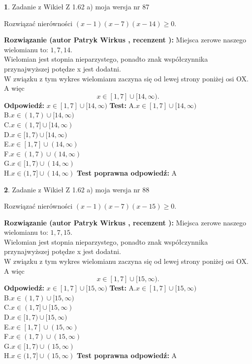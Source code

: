 \documentclass[12pt, a4paper]{article}
\theoremstyle{definition} %
\newtheorem{zad}{}
\newcommand{\zadStart}[1]{\begin{zad}#1\newline}
\newcommand{\zadStop}{\end{zad}}
\newcommand{\rozwStart}[2]{\noindent \textbf{Rozwiązanie (autor #1 , recenzent #2): }\newline}
\newcommand{\rozwStop}{\newline}
\newcommand{\odpStart}{\noindent \textbf{Odpowiedź:}\newline}
\newcommand{\odpStop}{\newline}
\newcommand{\testStart}{\noindent \textbf{Test:}\newline}
\newcommand{\testStop}{\newline}
\newcommand{\kluczStart}{\noindent \textbf{Test poprawna odpowiedź:}\newline}
\newcommand{\kluczStop}{\newline}
\begin{document}
\zadStart{Zadanie z Wikieł Z 1.62 a) moja wersja nr 87}

Rozwiązać nierówności $(x-1)(x-7)(x-14)\ge0$.
\zadStop
\rozwStart{Patryk Wirkus}{}
Miejsca zerowe naszego wielomianu to: $1, 7, 14$.\\
Wielomian jest stopnia nieparzystego, ponadto znak współczynnika przy\linebreak najwyższej potędze x jest dodatni.\\ W związku z tym wykres wielomianu zaczyna się od lewej strony poniżej osi OX. A więc $$x \in [1,7] \cup [14,\infty).$$
\rozwStop
\odpStart
$x \in [1,7] \cup [14,\infty)$
\odpStop
\testStart
A.$x \in [1,7] \cup [14,\infty)$\\
B.$x \in (1,7) \cup [14,\infty)$\\
C.$x \in (1,7] \cup [14,\infty)$\\
D.$x \in [1,7) \cup [14,\infty)$\\
E.$x \in [1,7] \cup (14,\infty)$\\
F.$x \in (1,7) \cup (14,\infty)$\\
G.$x \in [1,7) \cup (14,\infty)$\\
H.$x \in (1,7] \cup (14,\infty)$
\testStop
\kluczStart
A
\kluczStop



\zadStart{Zadanie z Wikieł Z 1.62 a) moja wersja nr 88}

Rozwiązać nierówności $(x-1)(x-7)(x-15)\ge0$.
\zadStop
\rozwStart{Patryk Wirkus}{}
Miejsca zerowe naszego wielomianu to: $1, 7, 15$.\\
Wielomian jest stopnia nieparzystego, ponadto znak współczynnika przy\linebreak najwyższej potędze x jest dodatni.\\ W związku z tym wykres wielomianu zaczyna się od lewej strony poniżej osi OX. A więc $$x \in [1,7] \cup [15,\infty).$$
\rozwStop
\odpStart
$x \in [1,7] \cup [15,\infty)$
\odpStop
\testStart
A.$x \in [1,7] \cup [15,\infty)$\\
B.$x \in (1,7) \cup [15,\infty)$\\
C.$x \in (1,7] \cup [15,\infty)$\\
D.$x \in [1,7) \cup [15,\infty)$\\
E.$x \in [1,7] \cup (15,\infty)$\\
F.$x \in (1,7) \cup (15,\infty)$\\
G.$x \in [1,7) \cup (15,\infty)$\\
H.$x \in (1,7] \cup (15,\infty)$
\testStop
\kluczStart
A
\kluczStop
\end{document}
